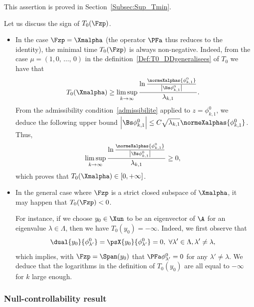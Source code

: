 This assertion is proved in Section~\ref{Subsec:Sup_Tmin}.


\begin{rema} \label{Rmq:T0positif}
Let us discuss the sign of $T_0(\Fzp)$.
\begin{itemize}
\item In the case $\Fzp=\Xmalpha$ (the operator $\PFa$ thus reduces to the identity), the minimal time $T_0(\Fzp)$ is always non-negative. Indeed, from the case $\mu = (1, 0,\,\dotsc,\,0)$ in the definition~\eqref{Def:T0_DDgeneralisees} of $T_0$ we have that
\[
T_0(\Xmalpha) \geq \limsup_{k\to \infty} \frac{\ln \frac{ \normeXalphas{\phi_{k,1}^0 } }{ \left| \Bs \phi_{k,1}^0 \right|}}{\lambda_{k,1}}.
\]
From the admissibility condition~\eqref{admissibilite} applied to $z=\phi_{k,1}^0$, we deduce the following upper bound $\left| \Bs \phi_{k,1}^0 \right| \leq C \sqrt{\lambda_{k,1}}\normeXalphas{\phi_{k,1}^0 }$. Thus,
\[
\limsup_{k\to \infty} \frac{\ln \frac{ \normeXalphas{\phi_{k,1}^0 } }{ \left| \Bs \phi_{k,1}^0 \right|}}{\lambda_{k,1}} \geq 0,
\]
which proves that $T_0(\Xmalpha) \in [0,+\infty]$.
\item In the general case where $\Fzp$ is a strict closed subspace of $\Xmalpha$, it may happen that $T_0(\Fzp)<0$.

For instance, if we choose $y_0\in \Xun$ to be an eigenvector of $\A$ for an eigenvalue $\lambda\in \Lambda$, then we have $T_0(y_0)=-\infty$. Indeed, we first observe that
\[
\dual{y_0}{\phi_{\lambda'}^0} = \psX{y_0}{\phi_{\lambda'}^0} = 0, \ \forall \lambda'\in \Lambda, \lambda'\neq \lambda,
\]
which implies, with $\Fzp=\Span(y_0)$ that $\PFa \phi_{\lambda'}^0=0$ for any $\lambda'\neq \lambda$. We deduce that the logarithms in the definition of $T_0(y_0)$ are all equal to $-\infty$ for $k$ large enough.
\end{itemize}
\end{rema}



\subsubsection{Null-controllability result}\label{Sect:mainresult}



